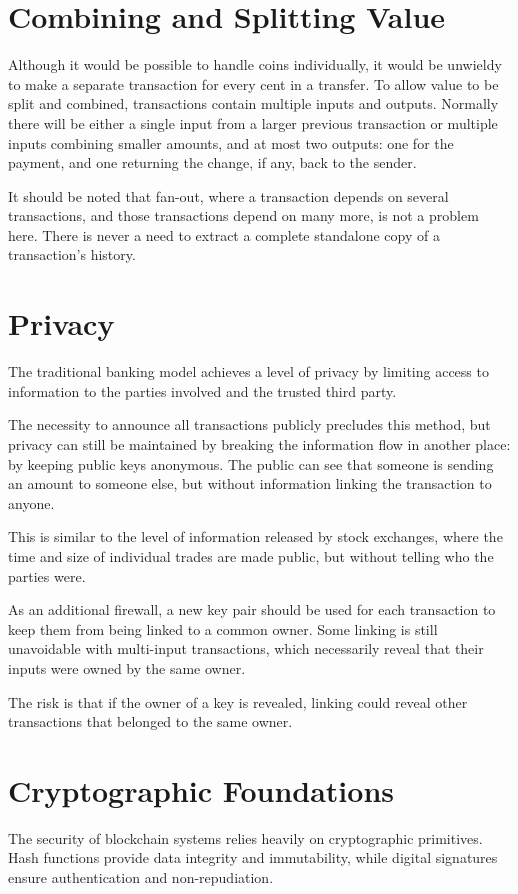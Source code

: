 \documentclass{article}
\begin{document}
{\section{Combining and Splitting Value}
Although it would be possible to handle coins individually, it would be unwieldy to make a separate transaction for every cent in a transfer. To allow value to be split and combined, transactions contain multiple inputs and outputs. Normally there will be either a single input from a larger previous transaction or multiple inputs combining smaller amounts, and at most two outputs: one for the payment, and one returning the change, if any, back to the sender.

It should be noted that fan-out, where a transaction depends on several transactions, and those transactions depend on many more, is not a problem here. There is never a need to extract a complete standalone copy of a transaction's history.

\section{Privacy}
The traditional banking model achieves a level of privacy by limiting access to information to the parties involved and the trusted third party.

The necessity to announce all transactions publicly precludes this method, but privacy can still be maintained by breaking the information flow in another place: by keeping public keys anonymous. The public can see that someone is sending an amount to someone else, but without information linking the transaction to anyone.

This is similar to the level of information released by stock exchanges, where the time and size of individual trades are made public, but without telling who the parties were.

As an additional firewall, a new key pair should be used for each transaction to keep them from being linked to a common owner. Some linking is still unavoidable with multi-input transactions, which necessarily reveal that their inputs were owned by the same owner.

The risk is that if the owner of a key is revealed, linking could reveal other transactions that belonged to the same owner.

\section{Cryptographic Foundations}
The security of blockchain systems relies heavily on cryptographic primitives. Hash functions provide data integrity and immutability, while digital signatures ensure authentication and non-repudiation.

}
\end{document}
